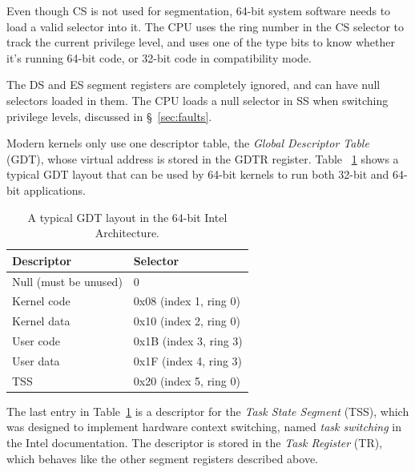 Even though CS is not used for segmentation, 64-bit system software needs to
load a valid selector into it. The CPU uses the ring number in the CS selector
to track the current privilege level, and uses one of the type bits to know
whether it's running 64-bit code, or 32-bit code in compatibility mode.


The DS and ES segment registers are completely ignored, and can have null
selectors loaded in them. The CPU loads a null selector in SS when switching
privilege levels, discussed in \S~\ref{sec:faults}.


Modern kernels only use one descriptor table, the \textit{Global Descriptor
Table} (GDT), whose virtual address is stored in the GDTR register. Table~
\ref{fig:gdt_layout} shows a typical GDT layout that can be used by 64-bit
kernels to run both 32-bit and 64-bit applications.

\begin{table}[hbt]
  \centering
  \begin{tabular}{| l | l |}
  \hline
  \textbf{Descriptor} & \textbf{Selector}\\
  \hline
  Null (must be unused) & 0 \\
  \hline
  Kernel code & 0x08 (index 1, ring 0) \\
  \hline
  Kernel data & 0x10 (index 2, ring 0) \\
  \hline
  User code & 0x1B (index 3, ring 3) \\
  \hline
  User data & 0x1F (index 4, ring 3) \\
  \hline
  TSS & 0x20 (index 5, ring 0) \\
  \hline
  \end{tabular}
  \caption{
    A typical GDT layout in the 64-bit Intel Architecture.
  }
  \label{fig:gdt_layout}
\end{table}


The last entry in Table~\ref{fig:gdt_layout} is a descriptor for the
\textit{Task State Segment} (TSS), which was designed to implement hardware
context switching, named \textit{task switching} in the Intel documentation.
The descriptor is stored in the \textit{Task Register} (TR), which behaves like
the other segment registers described above.

